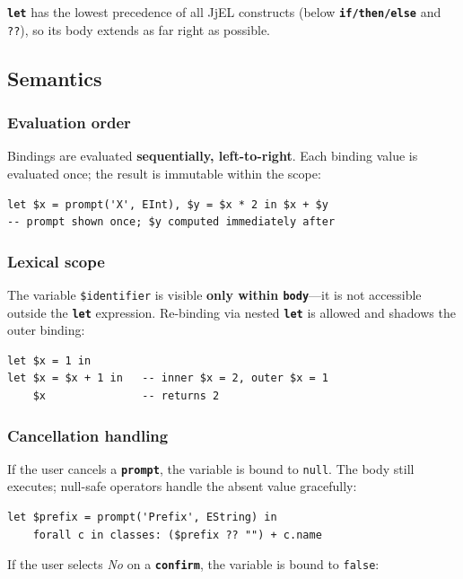\documentclass[11pt,a4paper]{article}
\newcommand{\jjel}{\textsf{JjEL}}
\newcommand{\kw}[1]{\texttt{\textbf{#1}}}
\begin{document}
\kw{let} has the lowest precedence of all \jjel{} constructs (below
\kw{if/then/else} and \texttt{??}), so its body extends as far right as
possible.


\subsection{Semantics}

\subsubsection{Evaluation order}

Bindings are evaluated \textbf{sequentially, left-to-right}. Each
binding value is evaluated once; the result is immutable within the
scope:

\begin{lstlisting}[style=jjel,numbers=none]
let $x = prompt('X', EInt), $y = $x * 2 in $x + $y
-- prompt shown once; $y computed immediately after
\end{lstlisting}

\subsubsection{Lexical scope}

The variable \texttt{\$identifier} is visible \textbf{only within
\texttt{body}}---it is not accessible outside the \kw{let} expression.
Re-binding via nested \kw{let} is allowed and shadows the outer binding:

\begin{lstlisting}[style=jjel,numbers=none]
let $x = 1 in
let $x = $x + 1 in   -- inner $x = 2, outer $x = 1
    $x               -- returns 2
\end{lstlisting}

\subsubsection{Cancellation handling}

If the user cancels a \kw{prompt}, the variable is bound to
\texttt{null}. The body still executes; null-safe operators handle the
absent value gracefully:

\begin{lstlisting}[style=jjtl,numbers=none]
let $prefix = prompt('Prefix', EString) in
    forall c in classes: ($prefix ?? "") + c.name
\end{lstlisting}

If the user selects \emph{No} on a \kw{confirm}, the variable is bound
to \texttt{false}:
\end{document}
